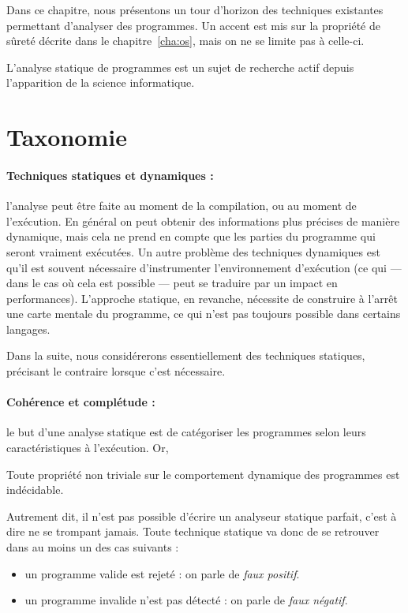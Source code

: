 Dans ce chapitre, nous présentons un tour d'horizon des techniques existantes
permettant d'analyser des programmes. Un accent est mis sur la propriété de
sûreté décrite dans le chapitre~\ref{cha:os}, mais on ne se limite pas à
celle-ci.

L'analyse statique de programmes est un sujet de recherche actif depuis
l'apparition de la science informatique.

\section{Taxonomie}

\paragraph{Techniques statiques et dynamiques :} l'analyse peut être faite au
moment de la compilation, ou au moment de l'exécution. En général on peut
obtenir des informations plus précises de manière dynamique, mais cela ne prend
en compte que les parties du programme qui seront vraiment exécutées. Un autre
problème des techniques dynamiques est qu'il est souvent nécessaire
d'instrumenter l'environnement d'exécution (ce qui --- dans le cas où cela est
possible --- peut se traduire par un impact en performances). L'approche
statique, en revanche, nécessite de construire à l'arrêt une carte mentale du
programme, ce qui n'est pas toujours possible dans certains langages.

Dans la suite, nous considérerons essentiellement des techniques statiques,
précisant le contraire lorsque c'est nécessaire.

\paragraph{Cohérence et complétude :} le but d'une analyse statique est de
catégoriser les programmes selon leurs caractéristiques à l'exécution. Or,

\begin{theorem}[de Rice]
  Toute propriété non triviale sur le comportement dynamique des programmes est
  indécidable.\cite{rice}
\end{theorem}

Autrement dit, il n'est pas possible d'écrire un analyseur statique parfait,
c'est à dire ne se trompant jamais. Toute technique statique va donc de se
retrouver dans au moins un des cas suivants :

\begin{itemize}
\item
  un programme valide est rejeté : on parle de \emph{faux positif}.
\item
  un programme invalide n'est pas détecté : on parle de
  \emph{faux négatif}.
\end{itemize}

